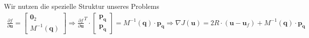 \documentclass[a4paper, 12pt]{scrartcl}
\begin{document}
Wir nutzen die spezielle Struktur unseres Problems
%
\begin{align*}
    \frac{\partial f}{\partial \bm{u}}
    =
    \begin{bmatrix}
        \bm{0}_2 \\
        M^{-1}(\bm{q})
    \end{bmatrix}
    \Rightarrow
    \frac{\partial f}{\partial \bm{u}}^T \cdot
    \begin{bmatrix}
        \bm{p}_{\bm{q}} \\
        \bm{p}_{\bm{\dot{q}}}
    \end{bmatrix}
    =
    M^{-1}(\bm{q}) \cdot \bm{p}_{\bm{\dot{q}}}
    \Rightarrow
    \nabla J(\bm{u})
    =
    2 R \cdot (\bm{u} - \bm{u}_f) + M^{-1}(\bm{q}) \cdot \bm{p}_{\bm{\dot{q}}}
\end{align*}
 
\end{document}
